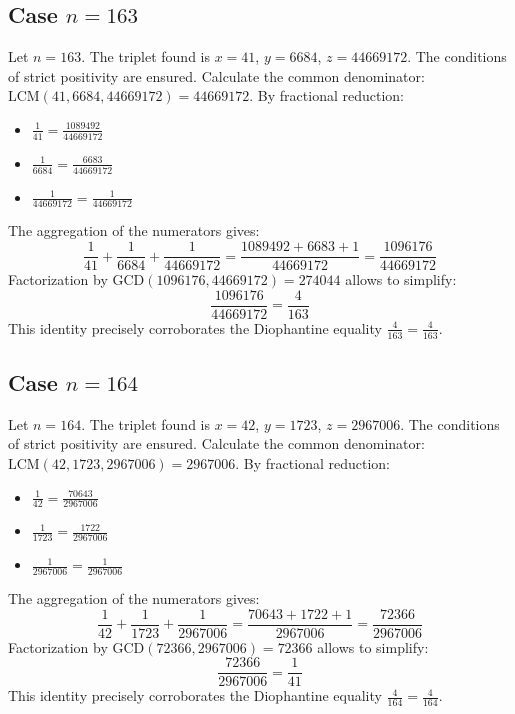 \documentclass[11pt,a4paper]{article}
\begin{document}
\subsection{Case $n = 163$}
Let $n = 163$. The triplet found is $x = 41$, $y = 6684$, $z = 44669172$.
The conditions of strict positivity are ensured.
Calculate the common denominator: $\text{LCM}(41, 6684, 44669172) = 44669172$.
By fractional reduction:
\begin{itemize}
    \item $\frac{1}{41} = \frac{1089492}{44669172}$
    \item $\frac{1}{6684} = \frac{6683}{44669172}$
    \item $\frac{1}{44669172} = \frac{1}{44669172}$
\end{itemize}
The aggregation of the numerators gives:
$$ \frac{1}{41} + \frac{1}{6684} + \frac{1}{44669172} = \frac{1089492 + 6683 + 1}{44669172} = \frac{1096176}{44669172} $$
Factorization by $\text{GCD}(1096176, 44669172) = 274044$ allows to simplify:
$$ \frac{1096176}{44669172} = \frac{4}{163} $$
This identity precisely corroborates the Diophantine equality $\frac{4}{163} = \frac{4}{163}$.

\subsection{Case $n = 164$}
Let $n = 164$. The triplet found is $x = 42$, $y = 1723$, $z = 2967006$.
The conditions of strict positivity are ensured.
Calculate the common denominator: $\text{LCM}(42, 1723, 2967006) = 2967006$.
By fractional reduction:
\begin{itemize}
    \item $\frac{1}{42} = \frac{70643}{2967006}$
    \item $\frac{1}{1723} = \frac{1722}{2967006}$
    \item $\frac{1}{2967006} = \frac{1}{2967006}$
\end{itemize}
The aggregation of the numerators gives:
$$ \frac{1}{42} + \frac{1}{1723} + \frac{1}{2967006} = \frac{70643 + 1722 + 1}{2967006} = \frac{72366}{2967006} $$
Factorization by $\text{GCD}(72366, 2967006) = 72366$ allows to simplify:
$$ \frac{72366}{2967006} = \frac{1}{41} $$
This identity precisely corroborates the Diophantine equality $\frac{4}{164} = \frac{4}{164}$.
\end{document}
